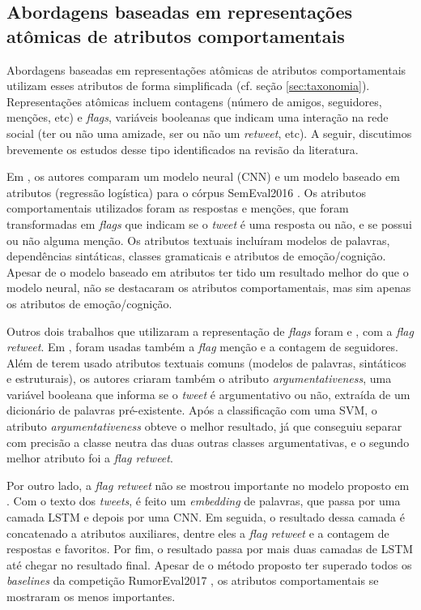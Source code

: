 \documentclass[
	12pt, oneside, a4paper, english, brazil
]{abntex2ppgsi}
\begin{document}
\subsection{Abordagens baseadas em representações atômicas de atributos comportamentais}

Abordagens baseadas em representações atômicas de atributos comportamentais utilizam esses atributos de forma simplificada (cf. seção \ref{sec:taxonomia}). Representações atômicas incluem contagens (número de amigos, seguidores, menções, etc) e {\em flags}, variáveis booleanas que indicam uma interação na rede social (ter ou não uma amizade, ser ou não um {\em retweet}, etc). A seguir, discutimos brevemente os estudos desse tipo identificados na revisão da literatura.

Em , os autores comparam um modelo neural (CNN) e um modelo baseado em atributos (regressão logística) para o córpus SemEval2016 \cite{semeval2016}. Os atributos comportamentais utilizados foram as respostas e menções, que foram transformadas em {\em flags} que indicam se o {\em tweet} é uma resposta ou não, e se possui ou não alguma menção. Os atributos textuais incluíram modelos de palavras, dependências sintáticas, classes gramaticais e atributos de emoção/cognição. Apesar de o modelo baseado em atributos ter tido um resultado melhor do que o modelo neural, não se destacaram os atributos comportamentais, mas sim apenas os atributos de emoção/cognição.

Outros dois trabalhos que utilizaram a representação de {\em flags} foram  e , com a {\em flag retweet}. Em , foram usadas também a {\em flag} menção e a contagem de seguidores. Além de terem usado atributos textuais comuns (modelos de palavras, sintáticos e estruturais), os autores criaram também o atributo {\em argumentativeness}, uma variável booleana que informa se o {\em tweet} é argumentativo ou não, extraída de um dicionário de palavras pré-existente. Após a classificação com uma SVM, o atributo {\em argumentativeness} obteve o melhor resultado, já que conseguiu separar com precisão a classe neutra das duas outras classes argumentativas, e o segundo melhor atributo foi a {\em flag retweet}.

Por outro lado, a {\em flag retweet} não se mostrou importante no modelo proposto em . Com o texto dos {\em tweets}, é feito um {\em embedding} de palavras, que passa por uma camada LSTM e depois por uma CNN. Em seguida, o resultado dessa camada é concatenado a atributos auxiliares, dentre eles a {\em flag retweet} e a contagem de respostas e favoritos. Por fim, o resultado passa por mais duas camadas de LSTM até chegar no resultado final. Apesar de o método proposto ter superado todos os {\em baselines} da competição RumorEval2017 \cite{rumoreval2017}, os atributos comportamentais se mostraram os menos importantes.
\end{document}
